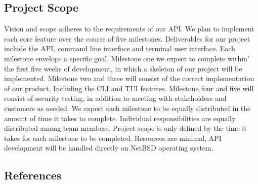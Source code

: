 \subsection{Project Scope}

Vision and scope adheres to the requirements of our API. We plan to implement each core feature over the course of five milestones. 
Deliverables for our project include the API, command line interface and terminal user interface. Each milestone envelops a 
specific goal. Milestone one we expect to complete within’ the first five weeks of development, in which a skeleton of our project 
will be implemented. Milestone two and three will consist of the correct implementation of our product. Including the CLI and TUI features. 
Milestone four and five will consist of security testing, in addition to meeting with stakeholders and customers as needed. We expect each 
milestone to be equally distributed in the amount of time it takes to complete. Individual responsibilities are equally distributed among 
team members. Project scope is only defined by the time it takes for each milestone to be completed. Resources are minimal, API development 
will be handled directly on NetBSD operating system. 

\subsection{References}


